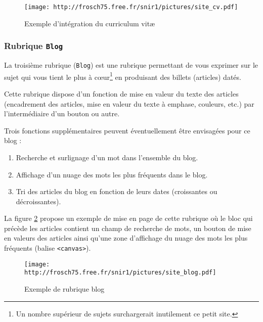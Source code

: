 \documentclass[a4paper,12pt]{article}
\newcommand\Code[1]{\textcolor{couleur_code}{\texttt{#1}}}
\begin{document}
\begin{figure}[htbp]
  \begin{center}
    \texttt{[image: http://frosch75.free.fr/snir1/pictures/site\_cv.pdf]} 
    \caption{Exemple d'intégration du curriculum vit\ae}
    \label{fig:mep2} 
  \end{center}
\end{figure}

\subsubsection{Rubrique \Code{Blog}}
La troisième rubrique (\Code{Blog}) est une rubrique permettant de vous 
exprimer sur le sujet qui vous tient le plus à c\oe ur\footnote{Un nombre 
supérieur de sujets surchargerait inutilement ce petit site.} en produisant 
des billets (articles) datés.

Cette rubrique dispose d'un fonction de mise en valeur du texte des articles 
(encadrement des articles, mise en valeur du texte à emphase, couleurs, etc.) 
par l'intermédiaire d'un bouton ou autre. 

Trois fonctions supplémentaires peuvent éventuellement être envisagées
pour ce blog : 

\begin{enumerate}
  \item Recherche et surlignage d'un mot dans l'ensemble du blog.
  \item Affichage d'un nuage des mots les plus fréquents dans le blog. 
  \item Tri des articles du blog en fonction de leurs dates (croissantes ou
        décroissantes).
\end{enumerate}
\vspace{10pt}

La figure \ref{fig:mep3} propose un exemple de mise en page de cette rubrique 
où le bloc qui précède les articles contient un champ de recherche de mots, un 
bouton de mise en valeurs des articles ainsi qu'une zone d'affichage du nuage 
des mots les plus fréquents (balise \Code{<canvas>}). 

\begin{figure}[htbp]
  \begin{center}
    \texttt{[image: http://frosch75.free.fr/snir1/pictures/site\_blog.pdf]} 
    \caption{Exemple de rubrique \og{}blog\fg{}}
    \label{fig:mep3} 
  \end{center}
\end{figure}
\end{document}

